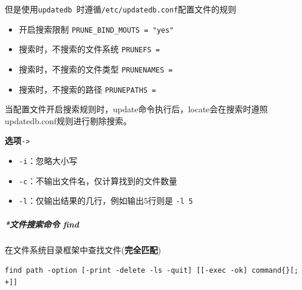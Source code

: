 \documentclass[UTF8,a4paper,12pt]{ctexbook}
\begin{document}
			但是使用\verb|updatedb |时遵循\verb|/etc/updatedb.conf|配置文件的规则
			\begin{itemize}[itemindent = 1em]
				\item 开启搜索限制 \verb|PRUNE_BIND_MOUTS = "yes"|
				\item 搜索时，不搜索的文件系统 \verb|PRUNEFS = |
				\item 搜索时，不搜索的文件类型 \verb|PRUNENAMES = |
				\item 搜索时，不搜索的路径 \verb|PRUNEPATHS =|
			\end{itemize}
			
			当配置文件开启搜索规则时，update命令执行后，locate会在搜索时遵照updatedb.conf规则进行剔除搜索。
			
			\textbf{选项}\verb|->|
			\begin{itemize}[itemindent = 1em]
				\item \verb|-i|：忽略大小写
				\item \verb|-c|：不输出文件名，仅计算找到的文件数量
				\item \verb|-l|：仅输出结果的几行，例如输出5行则是 \verb|-l 5|
			\end{itemize}
		
		\subparagraph{*文件搜索命令 find}	在文件系统目录框架中查找文件(\textbf{完全匹配})
		
			\hspace{1cm} \verb|find path -option [-print -delete -ls -quit] [[-exec -ok] command{}[; +]]| 
	
\end{document}

